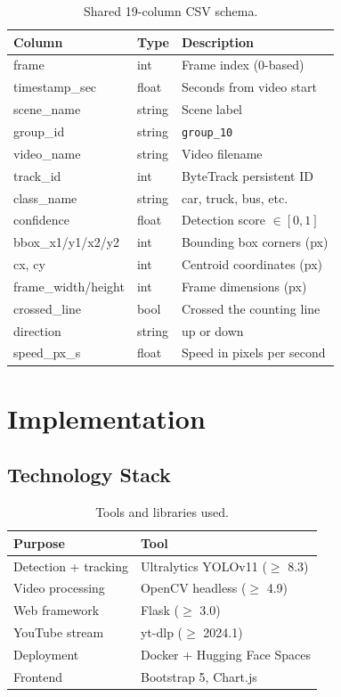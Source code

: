 \documentclass[12pt,a4paper,leqno]{report}
\begin{document}
\begin{table}[H]
  \centering\small
  \caption{Shared 19-column CSV schema.}
  \label{tab:schema}
  \begin{tabular}{lll}
    \toprule
    \textbf{Column} & \textbf{Type} & \textbf{Description}\\
    \midrule
    frame & int & Frame index (0-based)\\
    timestamp\_sec & float & Seconds from video start\\
    scene\_name & string & Scene label\\
    group\_id & string & \texttt{group\_10}\\
    video\_name & string & Video filename\\
    track\_id & int & ByteTrack persistent ID\\
    class\_name & string & car, truck, bus, etc.\\
    confidence & float & Detection score $\in[0,1]$\\
    bbox\_x1/y1/x2/y2 & int & Bounding box corners (px)\\
    cx, cy & int & Centroid coordinates (px)\\
    frame\_width/height & int & Frame dimensions (px)\\
    crossed\_line & bool & Crossed the counting line\\
    direction & string & up or down\\
    speed\_px\_s & float & Speed in pixels per second\\
    \bottomrule
  \end{tabular}
\end{table}

\chapter{Implementation}

\section{Technology Stack}

\begin{table}[H]
  \centering
  \caption{Tools and libraries used.}
  \begin{tabular}{ll}
    \toprule
    \textbf{Purpose} & \textbf{Tool}\\
    \midrule
    Detection + tracking & Ultralytics YOLOv11 ($\geq$ 8.3)\\
    Video processing & OpenCV headless ($\geq$ 4.9)\\
    Web framework & Flask ($\geq$ 3.0)\\
    YouTube stream & yt-dlp ($\geq$ 2024.1)\\
    Deployment & Docker + Hugging Face Spaces\\
    Frontend & Bootstrap 5, Chart.js\\
    \bottomrule
  \end{tabular}
\end{table}
\end{document}
